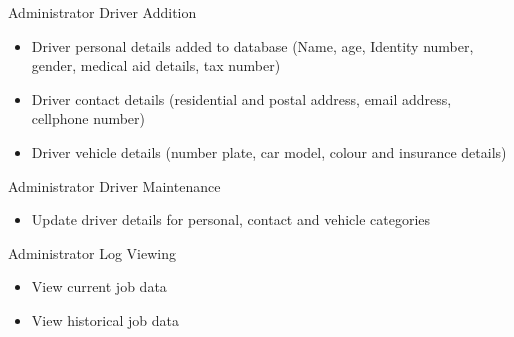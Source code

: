 \documentclass[10pt,twocolumn]{witseiepaper}
\begin{document}
Administrator Driver Addition
\begin{itemize}
\item Driver personal details added to database (Name, age, Identity number, gender, medical aid details, tax number)
\item Driver contact details (residential and postal address, email address, cellphone number)
\item Driver vehicle details (number plate, car model, colour and insurance details)
\end{itemize}
Administrator Driver Maintenance
\begin{itemize}
\item Update driver details for personal, contact and vehicle categories
\end{itemize}
Administrator Log Viewing
\begin{itemize}
\item View current job data
\item View historical job data
\end{itemize}





%



\end{document}
